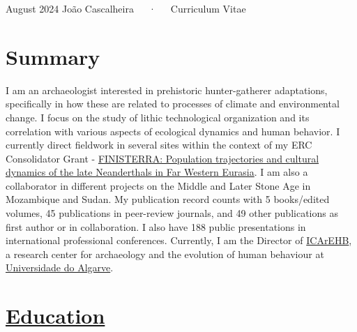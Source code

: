 \documentclass[11pt,a4paper,]{awesome-cv}
\begin{document}
\makecvheader

\makecvfooter
  {August 2024}
    {João Cascalheira~~~·~~~Curriculum Vitae}
  {\thepage}





\section{Summary}\label{summary}

I am an archaeologist interested in prehistoric hunter-gatherer
adaptations, specifically in how these are related to processes of
climate and environmental change. I focus on the study of lithic
technological organization and its correlation with various aspects of
ecological dynamics and human behavior. I currently direct fieldwork in
several sites within the context of my ERC Consolidator Grant -
\href{www.finisterra.icarehb.com}{FINISTERRA: Population trajectories
and cultural dynamics of the late Neanderthals in Far Western Eurasia}.
I am also a collaborator in different projects on the Middle and Later
Stone Age in Mozambique and Sudan. My publication record counts with 5
books/edited volumes, 45 publications in peer-review journals, and 49
other publications as first author or in collaboration. I also have 188
public presentations in international professional conferences.
Currently, I am the Director of \href{www.icarehb.com}{ICArEHB}, a
research center for archaeology and the evolution of human behaviour at
\href{www.ualg.pt}{Universidade do Algarve}.

\section{\texorpdfstring{\ul{Education}}{Education}}\label{education}
\end{document}

